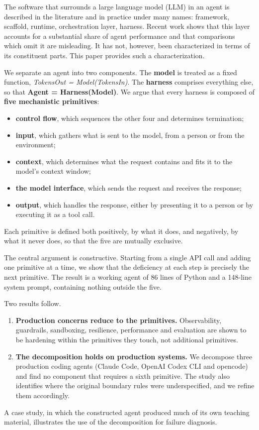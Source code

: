 The software that surrounds a large language model (LLM) in an agent is described in the literature and in practice under many names: framework, scaffold, runtime, orchestration layer, harness. Recent work shows that this layer accounts for a substantial share of agent performance and that comparisons which omit it are misleading. It has not, however, been characterized in terms of its constituent parts. This paper provides such a characterization.

We separate an agent into two components. The \textbf{model} is treated as a fixed function, \emph{TokensOut = Model(TokensIn)}. The \textbf{harness} comprises everything else, so that \textbf{Agent = Harness(Model)}. We argue that every harness is composed of \textbf{five mechanistic primitives}:

\begin{itemize}
\tightlist
\item
  \textbf{control flow}, which sequences the other four and determines termination;
\item
  \textbf{input}, which gathers what is sent to the model, from a person or from the environment;
\item
  \textbf{context}, which determines what the request contains and fits it to the model's context window;
\item
  \textbf{the model interface}, which sends the request and receives the response;
\item
  \textbf{output}, which handles the response, either by presenting it to a person or by executing it as a tool call.
\end{itemize}

Each primitive is defined both positively, by what it does, and negatively, by what it never does, so that the five are mutually exclusive.

The central argument is constructive. Starting from a single API call and adding one primitive at a time, we show that the deficiency at each step is precisely the next primitive. The result is a working agent of 86 lines of Python and a 148-line system prompt, containing nothing outside the five.

Two results follow.

\begin{enumerate}
\def\labelenumi{\arabic{enumi}.}
\tightlist
\item
  \textbf{Production concerns reduce to the primitives.} Observability, guardrails, sandboxing, resilience, performance and evaluation are shown to be hardening within the primitives they touch, not additional primitives.
\item
  \textbf{The decomposition holds on production systems.} We decompose three production coding agents (Claude Code, OpenAI Codex CLI and opencode) and find no component that requires a sixth primitive. The study also identifies where the original boundary rules were underspecified, and we refine them accordingly.
\end{enumerate}

A case study, in which the constructed agent produced much of its own teaching material, illustrates the use of the decomposition for failure diagnosis.
